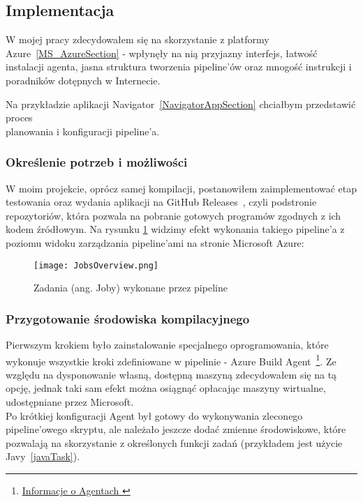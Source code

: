 \subsection{Implementacja}
W mojej pracy zdecydowałem się na skorzystanie z platformy Azure~\ref{MS_AzureSection} - 
wpłynęły na nią przyjazny interfejs, łatwość instalacji agenta, jasna struktura tworzenia pipeline'ów 
oraz mnogość instrukcji i poradników dotępnych w Internecie.

Na przykładzie aplikacji Navigator~\ref{NavigatorAppSection} chciałbym przedstawić proces \\
planowania i konfiguracji pipeline'a.

\subsubsection{Określenie potrzeb i możliwości}
W moim projekcie, oprócz samej kompilacji, postanowiłem zaimplementować etap testowania 
oraz wydania aplikacji na GitHub Releases~\cite{githubReleases}, czyli podstronie repozytoriów, która 
pozwala na pobranie gotowych programów zgodnych z ich kodem źródłowym.
Na rysunku \ref{img:JobsOverview} widzimy efekt wykonania takiego pipeline'a z poziomu 
widoku zarządzania pipeline'ami na stronie Microsoft Azure:

\begin{figure}[ht]
    \centering
    \texttt{[image: JobsOverview.png]}
    \caption{Zadania (ang. Joby) wykonane przez pipeline}
    \label{img:JobsOverview}
\end{figure}

\newpage

\subsubsection{Przygotowanie środowiska kompilacyjnego}
Pierwszym krokiem było zainstalowanie specjalnego oprogramowania, 
które wykonuje wszystkie kroki zdefiniowane w pipelinie - Azure Build Agent~\footnote[1]{
    \href{https://learn.microsoft.com/en-us/azure/devops/pipelines/agents/agents}{
        Informacje o Agentach
    }
}.
Ze względu na dysponowanie własną, dostępną maszyną zdecydowałem się na tą opcję,
jednak taki sam efekt można osiągnąć opłacając maszyny wirtualne, udostępniane przez Microsoft. \\%
Po krótkiej konfiguracji Agent był gotowy do wykonywania zleconego \\%
pipeline'owego skryptu, ale należało jeszcze dodać zmienne środowiskowe, 
które pozwalają na skorzystanie z określonych funkcji zadań (przykładem jest użycie Javy~\ref{javaTask}).

